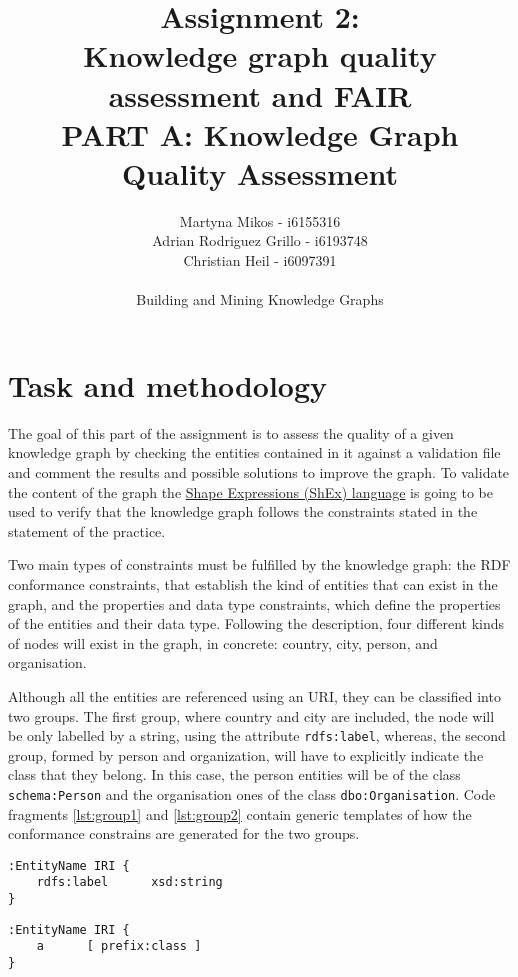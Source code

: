 \documentclass[11pt]{article}
\title{Assignment 2:\\ Knowledge graph quality assessment and FAIR\\ PART A: Knowledge Graph Quality Assessment}
\author{Martyna Mikos - i6155316\\
Adrian Rodriguez Grillo - i6193748\\
Christian Heil - i6097391\\\\ Building and Mining Knowledge Graphs}
\begin{document}
\maketitle
\section{Task and methodology}
The goal of this part of the assignment is to assess the quality of a given knowledge graph by checking the entities contained in it against a validation file and comment the results and possible solutions to improve the graph. 
To validate the content of the graph the \href{http://shex.io/}{Shape Expressions (ShEx) language} is going to be used to verify that the knowledge graph follows the constraints stated in the statement of the practice.

Two main types of constraints must be fulfilled by the knowledge graph: the RDF conformance constraints, that establish the kind of entities that can exist in the graph, and the properties and data type constraints, which define the properties of the entities and their data type.
Following the description, four different kinds of nodes will exist in the graph, in concrete: country, city, person, and organisation. 

Although all the entities are referenced using an URI, they can be classified into two groups. 
The first group, where country and city are included, the node will be only labelled by a string, using the attribute \texttt{rdfs:label}, whereas, the second group, formed by person and organization, will have to explicitly indicate the class that they belong. In this case, the person entities will be of the class \texttt{schema:Person} and the organisation ones of the class \texttt{dbo:Organisation}. 
Code fragments \ref{lst:group1} and \ref{lst:group2} contain generic templates of how the conformance constrains are generated for the two groups.

\noindent\begin{minipage}{.45\textwidth}
\centering
\begin{lstlisting}[caption=group 1 constrains,frame=single,label={lst:group1}]
:EntityName IRI {
    rdfs:label      xsd:string
}
\end{lstlisting}
\end{minipage}\hfill
\begin{minipage}{.45\textwidth}
\begin{lstlisting}[caption=group 2 constrains,frame=single,label={lst:group2}]
:EntityName IRI {
    a      [ prefix:class ]
}
\end{lstlisting}
\end{minipage}
\end{document}
